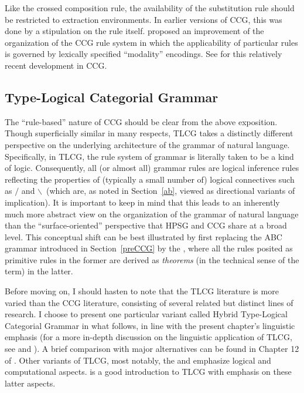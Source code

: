 \documentclass[output=paper
                ,modfonts
                ,nonflat
	        ,collection
	        ,collectionchapter
	        ,collectiontoclongg
 	        ,biblatex
                ,babelshorthands
                ,newtxmath
                ,draftmode
                ,colorlinks, citecolor=brown
]{./langsci/langscibook}
\begin{document}
Like the crossed composition rule, the availability of the
substitution rule should be restricted to extraction environments. In
earlier versions of CCG, this was done by a stipulation on
the rule itself. \citet{Baldridge2002a-u} proposed an improvement of the
organization of the CCG rule system in which the applicability of
particular rules is governed by lexically specified ``modality''
encodings. See \citet{steedman2011ccg} for this relatively recent
development in CCG.

\subsection{Type-Logical Categorial Grammar \label{sectlg}}

The ``rule-based'' nature of CCG should be clear from the above
exposition. Though superficially similar in many respects,
TLCG takes a distinctly different perspective on the
underlying architecture of the grammar of natural language.
Specifically, in TLCG, the rule system of grammar is literally taken
to be a kind of logic. Consequently, all (or almost all) grammar rules are logical
inference rules reflecting the properties of (typically a small number
of) logical connectives such as \ensuremath{/} and
\ensuremath{\backslash}\ (which are, as noted in Section~\ref{ab}, viewed as
directional variants of implication).
It is important to keep in mind that this leads to
an inherently much more abstract view on the
organization of the grammar of natural language than the
``surface-oriented'' perspective that HPSG and CCG share
at a broad level. This conceptual shift can be
best illustrated by first replacing the ABC grammar introduced in
Section~\ref{preCCG} by the , where all the rules
posited as primitive rules in the former are derived as \emph{theorems} (in
the technical sense of the term) in the latter.

Before moving on, I should hasten to note that the TLCG literature is
more varied than the CCG literature, consisting of several related but
distinct lines of research. I choose to present one particular variant
called Hybrid Type-Logical Categorial Grammar \citep{KubotaLevineBook}
in what follows, in line with the present chapter's linguistic
emphasis (for a more in-depth discussion on the linguistic application
of TLCG, see \citealt{Carpenter98a-u} and \citealt{KubotaLevineBook}).
A brief comparison with major alternatives
can be found in Chapter 12 of \citet{KubotaLevineBook}. 
Other variants of TLCG, most notably, the
 \citep{Moortgat2011a-u} and
 \citep{morrill2011} emphasize logical
and computational aspects. \citet{mootretore2012} is a good
introduction to TLCG with emphasis on these latter aspects.
\end{document}
